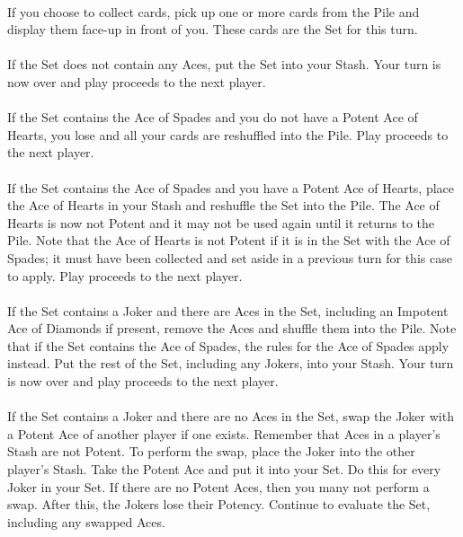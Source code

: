 \documentclass{article}
\begin{document}
\paragraph{}
\label{par:set}
If you choose to collect cards, pick up one or more cards from the Pile
and display them face-up in front of you. These cards are the Set for
this turn.

\paragraph{}
If the Set does not contain any Aces, put the Set into your Stash.
Your turn is now over and play proceeds to the next player. 

\paragraph{}
If the Set contains the Ace of Spades and you do not have a Potent Ace
of Hearts, you lose and all your cards are reshuffled into the Pile.
Play proceeds to the next player.

\paragraph{}
\label{par:spadeshearts}
If the Set contains the Ace of Spades and you have a Potent Ace of
Hearts, place the Ace of Hearts in your Stash and reshuffle the Set into
the Pile. The Ace of Hearts is now not Potent and it may not be used
again until it returns to the Pile. Note that the Ace of Hearts is not
Potent if it is in the Set with the Ace of Spades; it must have been
collected and set aside in a previous turn for this case to apply. Play
proceeds to the next player.

\paragraph{}
\label{par:jokersetaces}
If the Set contains a Joker and there are Aces in the Set, including an
Impotent Ace of Diamonds if present, remove the Aces and shuffle them into the
Pile. Note that if the Set contains the Ace of Spades, the rules for the Ace of
Spades apply instead. Put the rest of the Set, including any Jokers, into your
Stash. Your turn is now over and play proceeds to the next player.

\paragraph{}
\label{par:jokersetnoaces}
If the Set contains a Joker and there are no Aces in the Set, swap the
Joker with a Potent Ace of another player if one exists.  Remember that
Aces in a player's Stash are not Potent. To perform the swap, place the
Joker into the other player's Stash. Take the Potent Ace and put it into
your Set. Do this for every Joker in your Set. If there are no Potent
Aces, then you many not perform a swap. After this, the Jokers lose
their Potency. Continue to evaluate the Set, including any swapped Aces.
\end{document}
